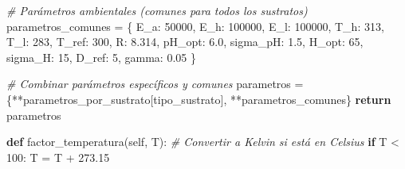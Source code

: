 \documentclass[
]{article}
\newenvironment{Shaded}{}{}
\newcommand{\CommentTok}[1]{\textcolor[rgb]{0.38,0.63,0.69}{\textit{#1}}}
\newcommand{\ControlFlowTok}[1]{\textcolor[rgb]{0.00,0.44,0.13}{\textbf{#1}}}
\newcommand{\DecValTok}[1]{\textcolor[rgb]{0.25,0.63,0.44}{#1}}
\newcommand{\FloatTok}[1]{\textcolor[rgb]{0.25,0.63,0.44}{#1}}
\newcommand{\KeywordTok}[1]{\textcolor[rgb]{0.00,0.44,0.13}{\textbf{#1}}}
\newcommand{\NormalTok}[1]{#1}
\newcommand{\OperatorTok}[1]{\textcolor[rgb]{0.40,0.40,0.40}{#1}}
\newcommand{\StringTok}[1]{\textcolor[rgb]{0.25,0.44,0.63}{#1}}
\newcommand{\VariableTok}[1]{\textcolor[rgb]{0.10,0.09,0.49}{#1}}
\begin{document}
\begin{Shaded}
\begin{Highlighting}[]
        \CommentTok{\# Parámetros ambientales (comunes para todos los sustratos)}
\NormalTok{        parametros\_comunes }\OperatorTok{=}\NormalTok{ \{}
            \StringTok{\textquotesingle{}E\_a\textquotesingle{}}\NormalTok{: }\DecValTok{50000}\NormalTok{, }\StringTok{\textquotesingle{}E\_h\textquotesingle{}}\NormalTok{: }\DecValTok{100000}\NormalTok{, }\StringTok{\textquotesingle{}E\_l\textquotesingle{}}\NormalTok{: }\DecValTok{100000}\NormalTok{, }
            \StringTok{\textquotesingle{}T\_h\textquotesingle{}}\NormalTok{: }\DecValTok{313}\NormalTok{, }\StringTok{\textquotesingle{}T\_l\textquotesingle{}}\NormalTok{: }\DecValTok{283}\NormalTok{, }\StringTok{\textquotesingle{}T\_ref\textquotesingle{}}\NormalTok{: }\DecValTok{300}\NormalTok{, }\StringTok{\textquotesingle{}R\textquotesingle{}}\NormalTok{: }\FloatTok{8.314}\NormalTok{,}
            \StringTok{\textquotesingle{}pH\_opt\textquotesingle{}}\NormalTok{: }\FloatTok{6.0}\NormalTok{, }\StringTok{\textquotesingle{}sigma\_pH\textquotesingle{}}\NormalTok{: }\FloatTok{1.5}\NormalTok{,}
            \StringTok{\textquotesingle{}H\_opt\textquotesingle{}}\NormalTok{: }\DecValTok{65}\NormalTok{, }\StringTok{\textquotesingle{}sigma\_H\textquotesingle{}}\NormalTok{: }\DecValTok{15}\NormalTok{,}
            \StringTok{\textquotesingle{}D\_ref\textquotesingle{}}\NormalTok{: }\DecValTok{5}\NormalTok{, }\StringTok{\textquotesingle{}gamma\textquotesingle{}}\NormalTok{: }\FloatTok{0.05}
\NormalTok{        \}}
        
        \CommentTok{\# Combinar parámetros específicos y comunes}
\NormalTok{        parametros }\OperatorTok{=}\NormalTok{ \{}\OperatorTok{**}\NormalTok{parametros\_por\_sustrato[tipo\_sustrato], }\OperatorTok{**}\NormalTok{parametros\_comunes\}}
        \ControlFlowTok{return}\NormalTok{ parametros}
    
    \KeywordTok{def}\NormalTok{ factor\_temperatura(}\VariableTok{self}\NormalTok{, T):}
        \CommentTok{\# Convertir a Kelvin si está en Celsius}
        \ControlFlowTok{if}\NormalTok{ T }\OperatorTok{\textless{}} \DecValTok{100}\NormalTok{:}
\NormalTok{            T }\OperatorTok{=}\NormalTok{ T }\OperatorTok{+} \FloatTok{273.15}
            

\end{Highlighting}
\end{Shaded}
\end{document}
